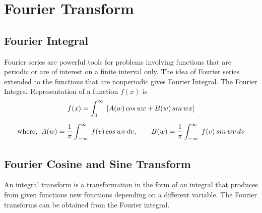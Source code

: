\message{ !name(ch3_aima331.tex)}\documentclass[aima331_lecturenotes_ku.tex]{subfiles}
\begin{document}

\chapter{Fourier Transform}
\section{Fourier Integral}
Fourier series are powerful tools for problems involving functions that are periodic or are of interest on a finite interval only. The idea of Fourier series extended to the functions that are nonperiodic gives Fourier Integral. The Fourier Integral Representation of a function $f(x)$ is
\begin{equation}
   \label{fourier_integral}
  \begin{gathered}[t]
    f(x) = \int_0^{\infty} \; \left [ A(w)\, cos\,wx + B(w)\, sin\,wx \right] \\[2mm]
     \text{where,} \hspace{2mm} A(w) =\frac{1}{\pi} \int_{-\infty}^{\infty} \; f(v)\,cos\,wv\,dv, \hspace{7mm} B(w) =\frac{1}{\pi} \int_{-\infty}^{\infty} \; f(v)\,sin\,wv\,dv
    \end{gathered}
  \end{equation}

\section{Fourier Cosine and Sine Transform}
An integral transform is a transformation in the form of an integral that produces from given functions new functions depending on a different variable. The Fourier transforms can be obtained from the Fourier integral.
\end{document}
